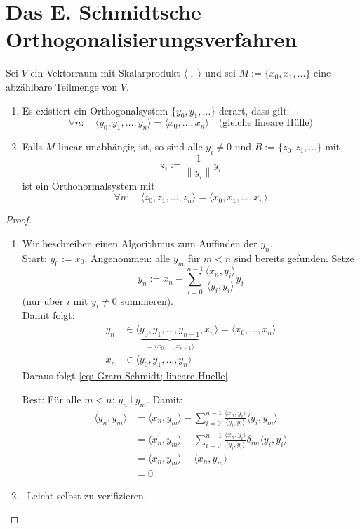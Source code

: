 \documentclass[parskip,a4paper,twoside,DIV15,BCOR12mm]{scrbook}
\begin{document}
\section{Das E. Schmidtsche Orthogonalisierungsverfahren}
\begin{theo}
\label{Satz 17.1}
Sei \(V\) ein Vektorraum mit Skalarprodukt \(\operatorname{\langle\cdot,\cdot\rangle}\) und sei 
\(M:=\{x_{0},x_{1},\ldots\}\) eine abzählbare Teilmenge von \(V\).
\begin{enumerate}
\item Es existiert ein Orthogonalsystem \(\{y_{0},y_{1},\ldots\}\) derart, 
dass gilt:
\begin{equation}
\label{eq: Gram-Schmidt; lineare Huelle}
\forall n:\quad\langle y_{0},y_{1},\ldots,y_{n}\rangle=\langle x_{0},\ldots,x_{n}\rangle\quad\text{(gleiche lineare Hülle)}
\end{equation}
\item Falls \(M\) linear unabhängig ist, so sind alle \(y_{i}\neq0\) und
\(B:=\{z_{0},z_{1},\ldots\}\) mit
\[
z_{i}:=\frac{1}{\lVert y_{i}\rVert}y_{i}
\]
ist ein Orthonormalsystem mit 
\[
\forall n:\quad\langle z_{0},z_{1},\ldots,z_{n}\rangle=\langle x_{0},x_{1},\ldots,x_{n}\rangle
\]
\end{enumerate}
\end{theo}
\begin{proof}
\begin{enumerate}
\item Wir beschreiben einen Algorithmus zum Auffinden der \(y_{n}\).\\
Start: \(y_{0}:=x_{0}\). Angenommen: alle \(y_{m}\) für \(m<n\) sind bereits
gefunden. Setze
\[
y_{n}:=x_{n}-\sum_{i=0}^{n-1}{\frac{\langle x_{n},y_{i}\rangle}{\langle y_{i},y_{i}\rangle}}y_{i}
\]
(nur über \(i\) mit \(y_{i}\neq0\) summieren).\\
Damit folgt:
\begin{align*}
y_{n}&\in\langle\underbrace{y_{0},y_{1},\ldots,y_{n-1}}_{=\langle x_{0},\ldots,x_{n-1}\rangle},x_{n}\rangle=\langle x_{0},\ldots,x_{n}\rangle\\
x_{n}&\in\langle y_{0},y_{1},\ldots,y_{n}\rangle
\end{align*}
Daraus folgt \eqref{eq: Gram-Schmidt; lineare Huelle}.

Rest: Für alle \(m<n:\,y_{n}\bot y_{m}\). Damit:
\begin{align*}
\langle y_{n},y_{m}\rangle&=\langle x_{n},y_{m}\rangle-\sum_{i=0}^{n-1}{\frac{\langle x_{n},y_{i}\rangle}{\langle y_{i},y_{i}\rangle}}\langle y_{i},y_{m}\rangle\\
&=\langle x_{n},y_{m}\rangle-\sum_{i=0}^{n-1}{\frac{\langle x_{n},y_{i}\rangle}{\langle y_{i},y_{i}\rangle}}\delta_{im}\langle y_{i},y_{i}\rangle\\
&=\langle x_{n},y_{m}\rangle-\langle x_{n},y_{m}\rangle\\
&=0
\end{align*}
\item \checkmark \ Leicht selbst zu verifizieren.
\end{enumerate}
\end{proof}
\end{document}

